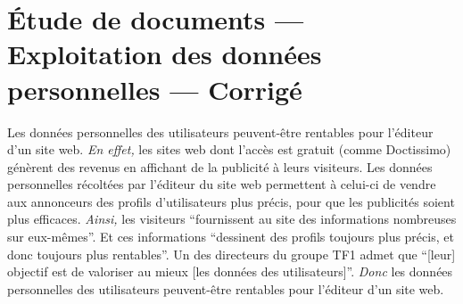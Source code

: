\documentclass[12pt]{article}
\begin{document}
\section*{Étude de documents --- Exploitation des données personnelles --- Corrigé}

Les données personnelles des utilisateurs peuvent-être rentables pour l'éditeur d'un site web.
\emph{En effet,} les sites web dont l'accès est gratuit (comme Doctissimo) génèrent des revenus en affichant de la publicité à leurs visiteurs. Les données personnelles récoltées par l'éditeur du site web permettent à celui-ci de vendre aux annonceurs des profils d'utilisateurs plus précis, pour que les publicités soient plus efficaces.
\emph{Ainsi,} les visiteurs \enquote{fournissent au site des informations nombreuses sur eux-mêmes}. Et ces informations \enquote{dessinent des profils toujours plus précis, et donc toujours plus rentables}. Un des directeurs du groupe TF1 admet que \enquote{[leur] objectif est de valoriser au mieux [les données des utilisateurs]}.
\emph{Donc} les données personnelles des utilisateurs peuvent-être rentables pour l'éditeur d'un site web.
\end{document}
